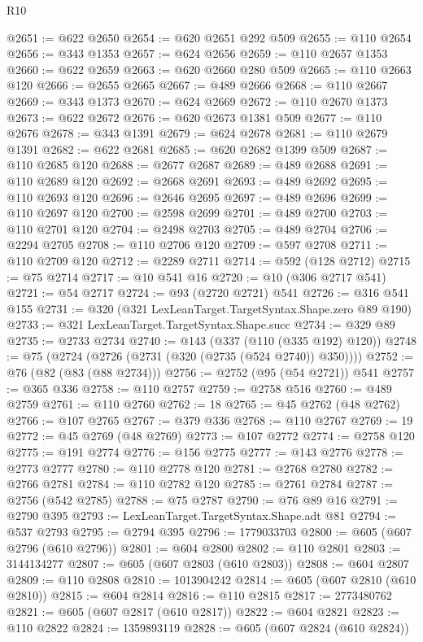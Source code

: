 \begin{lexlean}{R10}
\begin{coremodule}
@2651 := @622 @2650
@2654 := @620 @2651 @292 @509
@2655 := @110 @2654
@2656 := @343 @1353
@2657 := @624 @2656
@2659 := @110 @2657 @1353
@2660 := @622 @2659
@2663 := @620 @2660 @280 @509
@2665 := @110 @2663 @120
@2666 := @2655 @2665
@2667 := @489 @2666
@2668 := @110 @2667
@2669 := @343 @1373
@2670 := @624 @2669
@2672 := @110 @2670 @1373
@2673 := @622 @2672
@2676 := @620 @2673 @1381 @509
@2677 := @110 @2676
@2678 := @343 @1391
@2679 := @624 @2678
@2681 := @110 @2679 @1391
@2682 := @622 @2681
@2685 := @620 @2682 @1399 @509
@2687 := @110 @2685 @120
@2688 := @2677 @2687
@2689 := @489 @2688
@2691 := @110 @2689 @120
@2692 := @2668 @2691
@2693 := @489 @2692
@2695 := @110 @2693 @120
@2696 := @2646 @2695
@2697 := @489 @2696
@2699 := @110 @2697 @120
@2700 := @2598 @2699
@2701 := @489 @2700
@2703 := @110 @2701 @120
@2704 := @2498 @2703
@2705 := @489 @2704
@2706 := @2294 @2705
@2708 := @110 @2706 @120
@2709 := @597 @2708
@2711 := @110 @2709 @120
@2712 := @2289 @2711
@2714 := @592 (@128 @2712)
@2715 := @75 @2714
@2717 := @10 @541 @16
@2720 := @10 (@306 @2717 @541)
@2721 := @54 @2717
@2724 := @93 (@2720 @2721) @541
@2726 := @316 @541 @155
@2731 := @320 (@321 LexLeanTarget.TargetSyntax.Shape.zero @89 @190)
@2733 := @321 LexLeanTarget.TargetSyntax.Shape.succ
@2734 := @329 @89
@2735 := @2733 @2734
@2740 := @143 (@337 (@110 (@335 @192) @120))
@2748 := @75 (@2724 (@2726 (@2731 (@320 (@2735 (@524 @2740)) @350))))
@2752 := @76 (@82 (@83 (@88 @2734)))
@2756 := @2752 (@95 (@54 @2721)) @541
@2757 := @365 @336
@2758 := @110 @2757
@2759 := @2758 @516
@2760 := @489 @2759
@2761 := @110 @2760
@2762 := 18
@2765 := @45 @2762 (@48 @2762)
@2766 := @107 @2765
@2767 := @379 @336
@2768 := @110 @2767
@2769 := 19
@2772 := @45 @2769 (@48 @2769)
@2773 := @107 @2772
@2774 := @2758 @120
@2775 := @191 @2774
@2776 := @156 @2775
@2777 := @143 @2776
@2778 := @2773 @2777
@2780 := @110 @2778 @120
@2781 := @2768 @2780
@2782 := @2766 @2781
@2784 := @110 @2782 @120
@2785 := @2761 @2784
@2787 := @2756 (@542 @2785)
@2788 := @75 @2787
@2790 := @76 @89 @16
@2791 := @2790 @395
@2793 := LexLeanTarget.TargetSyntax.Shape.adt @81
@2794 := @537 @2793
@2795 := @2794 @395
@2796 := 1779033703
@2800 := @605 (@607 @2796 (@610 @2796))
@2801 := @604 @2800
@2802 := @110 @2801
@2803 := 3144134277
@2807 := @605 (@607 @2803 (@610 @2803))
@2808 := @604 @2807
@2809 := @110 @2808
@2810 := 1013904242
@2814 := @605 (@607 @2810 (@610 @2810))
@2815 := @604 @2814
@2816 := @110 @2815
@2817 := 2773480762
@2821 := @605 (@607 @2817 (@610 @2817))
@2822 := @604 @2821
@2823 := @110 @2822
@2824 := 1359893119
@2828 := @605 (@607 @2824 (@610 @2824))

\end{coremodule}
\end{lexlean}
